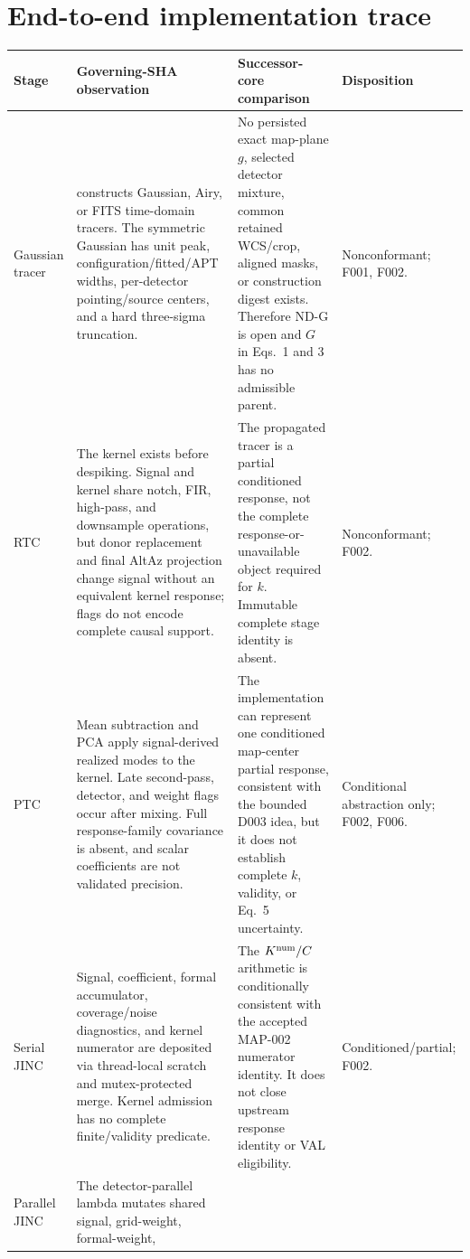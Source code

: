 \documentclass[10pt]{article}
\newcommand{\code}[1]{\texttt{\detokenize{#1}}}
\begin{document}
\section{End-to-end implementation trace}

\begin{longtable}{@{}L{0.135\textwidth}L{0.28\textwidth}L{0.30\textwidth}L{0.20\textwidth}@{}}
\toprule
Stage & Governing-SHA observation & Successor-core comparison & Disposition \\
\midrule
\endhead
Gaussian tracer &
\code{Kernel} constructs Gaussian, Airy, or FITS time-domain tracers.
The symmetric Gaussian has unit peak, configuration/fitted/APT widths,
per-detector pointing/source centers, and a hard three-sigma truncation. &
No persisted exact map-plane $g$, selected detector mixture, common retained
WCS/crop, aligned masks, or construction digest exists.  Therefore ND-G is
open and $G$ in Eqs.~1 and 3 has no admissible parent. &
Nonconformant; F001, F002. \\
RTC &
The kernel exists before despiking.  Signal and kernel share notch, FIR,
high-pass, and downsample operations, but donor replacement and final AltAz
projection change signal without an equivalent kernel response; flags do not
encode complete causal support. &
The propagated tracer is a partial conditioned response, not the complete
response-or-unavailable object required for $k$.  Immutable complete stage
identity is absent. &
Nonconformant; F002. \\
PTC &
Mean subtraction and PCA apply signal-derived realized modes to the kernel.
Late second-pass, detector, and weight flags occur after mixing.  Full
response-family covariance is absent, and scalar coefficients are not
validated precision. &
The implementation can represent one conditioned map-center partial
response, consistent with the bounded D003 idea, but it does not establish
complete $k$, validity, or Eq.~5 uncertainty. &
Conditional abstraction only; F002, F006. \\
Serial JINC &
Signal, coefficient, formal accumulator, coverage/noise diagnostics, and
kernel numerator are deposited via thread-local scratch and mutex-protected
merge.  Kernel admission has no complete finite/validity predicate. &
The $K^{\rm num}/C$ arithmetic is conditionally consistent with the accepted
MAP-002 numerator identity.  It does not close upstream response identity or
VAL eligibility. &
Conditioned/partial; F002. \\
Parallel JINC &
The detector-parallel lambda mutates shared signal, grid-weight, formal-weight,

\end{longtable}
\end{document}
